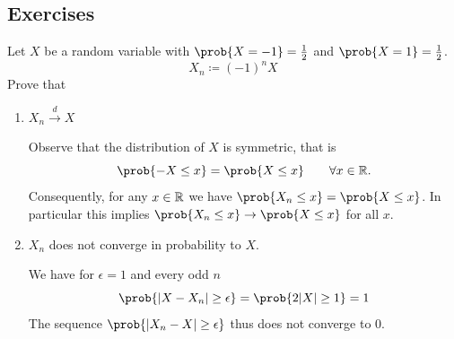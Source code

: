 \subsection*{Exercises}

\begin{exercise}
    \label{ex: convergence in distribution but not in probability}
    Let \(X\) be a random variable with \(\prob{X=-1} = \frac12\) and \(\prob{X=1}=\frac12\).
    \[
        X_n \coloneq (-1)^n X
    \]
    Prove that
    \begin{enumerate}[label=(\alph*), noitemsep]
        \item \(X_n \xrightarrow{d} X\)
        \begin{solution}
            Observe that the distribution of \(X\) is symmetric, that is
            \[
                \prob{-X \le x} = \prob{X \le x} \qquad \forall x\in \real.
            \]
            Consequently, for any \(x \in \mathbb{R}\) we have \(\prob{X_n \le x} = \prob{X \le x}\).
            In particular this implies \(\prob{X_n \le x} \to \prob{X \le x}\) for all \(x\).
        \end{solution}

        \item \(X_n\) does not converge in probability to \(X\).
        \begin{solution}
            We have for \(\epsilon = 1\) and every odd \(n\)
            \[
                \prob{\abs{X - X_n} \ge \epsilon}
                = \prob{2\abs{X} \ge 1} = 1
            \]
            The sequence \(\prob{|X_n - X| \ge \epsilon}\) thus does not converge to \(0\).
        \end{solution}
    \end{enumerate}
\end{exercise}

